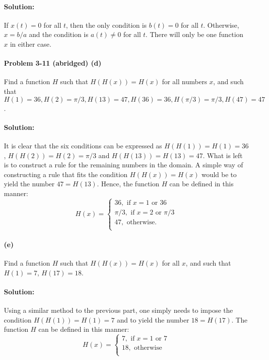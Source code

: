 \documentclass{article}
\begin{document}
\paragraph{Solution:} If $x(t) = 0$ for all $t$, then the only condition is
$b(t) = 0$ for all $t$. Otherwise, $x = b/a$ and the condition is $a(t) \neq 0$
for all $t$. There will only be one function $x$ in either case.

\paragraph{Problem 3-11 (abridged) (d)} Find a function $H$ such that $H(H(x))
= H(x)$ for all numbers $x$, and such that $H(1) = 36, H(2) = \pi/3, H(13) =
47, H(36) = 36, H(\pi/3) = \pi/3, H(47) = 47$.

\paragraph{Solution:} It is clear that the six conditions can be expressed as
$H(H(1)) = H(1) = 36$, $H(H(2)) = H(2) = \pi/3$ and $H(H(13)) = H(13) = 47$.
What is left is to construct a rule for the remaining numbers in the domain. A
simple way of constructing a rule that fits the condition $H(H(x)) = H(x)$
would be to yield the number $47 = H(13)$. Hence, the function $H$ can be
defined in this manner: \begin{equation*}
  H(x) = \begin{cases}
    36, \text{ if } x = 1 \text{ or } 36 \\
    \pi/3, \text{ if } x = 2 \text{ or } \pi/3 \\
    47, \text{ otherwise.} \\
  \end{cases}
\end{equation*}

\paragraph{(e)} Find a function $H$ such that $H(H(x)) = H(x)$ for all $x$, and
such that $H(1) = 7$, $H(17) = 18$.

\paragraph{Solution:} Using a similar method to the previous part, one simply
needs to impose the condition $H(H(1)) = H(1) = 7$ and to yield the number $18
= H(17)$. The function $H$ can be defined in this manner:
\begin{equation*}
  H(x) = \begin{cases}
    7, \text{ if } x = 1 \text{ or } 7 \\
    18, \text{ otherwise} \\
  \end{cases}
\end{equation*}
\end{document}
